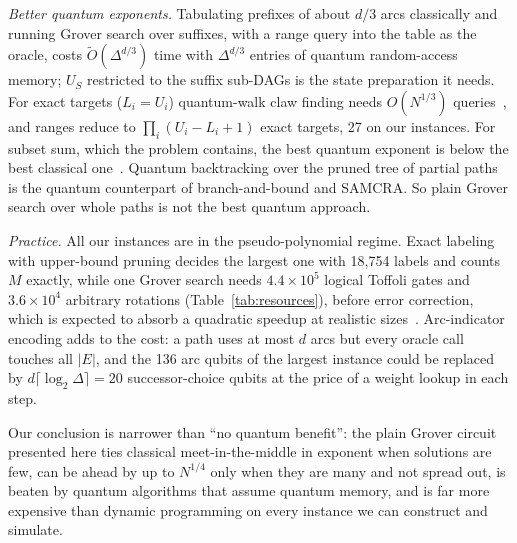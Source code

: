 \documentclass[journal]{IEEEtran}
\begin{document}
\emph{Better quantum exponents.} Tabulating prefixes of about $d/3$ arcs classically and running Grover search over suffixes, with a range query into the table as the oracle, costs $\tilde O(\Delta^{d/3})$ time with $\Delta^{d/3}$ entries of quantum random-access memory; $U_{S}$ restricted to the suffix sub-DAGs is the state preparation it needs. For exact targets ($L_{i}=U_{i}$) quantum-walk claw finding needs $O(N^{1/3})$ queries~\cite{tani2009,ambainis2007}, and ranges reduce to $\prod_{i}(U_{i}-L_{i}+1)$ exact targets, 27 on our instances. For subset sum, which the problem contains, the best quantum exponent is below the best classical one~\cite{bonnetain2020}. Quantum backtracking over the pruned tree of partial paths~\cite{montanaro2018} is the quantum counterpart of branch-and-bound and SAMCRA. So plain Grover search over whole paths is not the best quantum approach.

\emph{Practice.} All our instances are in the pseudo-polynomial regime. Exact labeling with upper-bound pruning decides the largest one with 18{,}754 labels and counts $M$ exactly, while one Grover search needs $4.4\times10^{5}$ logical Toffoli gates and $3.6\times10^{4}$ arbitrary rotations (Table~\ref{tab:resources}), before error correction, which is expected to absorb a quadratic speedup at realistic sizes~\cite{babbush2021,sanders2020}. Arc-indicator encoding adds to the cost: a path uses at most $d$ arcs but every oracle call touches all $|E|$, and the 136 arc qubits of the largest instance could be replaced by $d\lceil\log_{2}\Delta\rceil = 20$ successor-choice qubits at the price of a weight lookup in each step.

Our conclusion is narrower than ``no quantum benefit'': the plain Grover circuit presented here ties classical meet-in-the-middle in exponent when solutions are few, can be ahead by up to $N^{1/4}$ only when they are many and not spread out, is beaten by quantum algorithms that assume quantum memory, and is far more expensive than dynamic programming on every instance we can construct and simulate.
\end{document}
